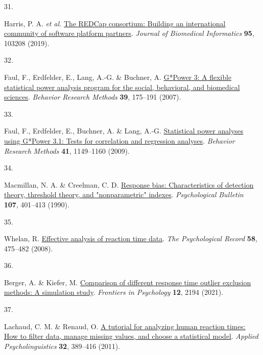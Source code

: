 \documentclass[
  man,floatsintext]{apa6}
\newlength{\cslhangindent}
\newlength{\csllabelwidth}
\newlength{\cslentryspacingunit} %
\newenvironment{CSLReferences}[2] %
 {%
  \setlength{\parindent}{0pt}
  \ifodd #1
  \let\oldpar\par
  \def\par{\hangindent=\cslhangindent\oldpar}
  \fi
  \setlength{\parskip}{#2\cslentryspacingunit}
 }%
 {}
\newcommand{\CSLLeftMargin}[1]{\parbox[t]{\csllabelwidth}{#1}}
\newcommand{\CSLRightInline}[1]{\parbox[t]{\linewidth - \csllabelwidth}{#1}\break}
\begin{document}
\begin{CSLReferences}{0}{0}
\leavevmode{}%
\CSLLeftMargin{31. }%
\CSLRightInline{Harris, P. A. \emph{et al.} \href{https://doi.org/10.1016/j.jbi.2019.103208}{The {REDCap} consortium: {Building} an international community of software platform partners}. \emph{Journal of Biomedical Informatics} \textbf{95}, 103208 (2019).}

\leavevmode{}%
\CSLLeftMargin{32. }%
\CSLRightInline{Faul, F., Erdfelder, E., Lang, A.-G. \& Buchner, A. \href{https://doi.org/10.3758/BF03193146}{G*{Power} 3: {A} flexible statistical power analysis program for the social, behavioral, and biomedical sciences}. \emph{Behavior Research Methods} \textbf{39}, 175--191 (2007).}

\leavevmode{}%
\CSLLeftMargin{33. }%
\CSLRightInline{Faul, F., Erdfelder, E., Buchner, A. \& Lang, A.-G. \href{https://doi.org/10.3758/BRM.41.4.1149}{Statistical power analyses using {G}*{Power} 3.1: {Tests} for correlation and regression analyses}. \emph{Behavior Research Methods} \textbf{41}, 1149--1160 (2009).}

\leavevmode{}%
\CSLLeftMargin{34. }%
\CSLRightInline{Macmillan, N. A. \& Creelman, C. D. \href{https://doi.org/10.1037/0033-2909.107.3.401}{Response bias: {Characteristics} of detection theory, threshold theory, and "nonparametric" indexes}. \emph{Psychological Bulletin} \textbf{107}, 401--413 (1990).}

\leavevmode{}%
\CSLLeftMargin{35. }%
\CSLRightInline{Whelan, R. \href{https://doi.org/10.1007/BF03395630}{Effective analysis of reaction time data}. \emph{The Psychological Record} \textbf{58}, 475--482 (2008).}

\leavevmode{}%
\CSLLeftMargin{36. }%
\CSLRightInline{Berger, A. \& Kiefer, M. \href{https://doi.org/10.3389/fpsyg.2021.675558}{Comparison of different response time outlier exclusion methods: {A} simulation study}. \emph{Frontiers in Psychology} \textbf{12}, 2194 (2021).}

\leavevmode{}%
\CSLLeftMargin{37. }%
\CSLRightInline{Lachaud, C. M. \& Renaud, O. \href{https://doi.org/10.1017/s0142716410000457}{A tutorial for analyzing human reaction times: {How} to filter data, manage missing values, and choose a statistical model}. \emph{Applied Psycholinguistics} \textbf{32}, 389--416 (2011).}


\end{CSLReferences}
\end{document}
